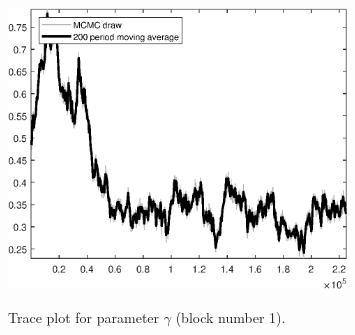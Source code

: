 \begin{figure}[H]
\centering
  \includegraphics[width=0.8\textwidth]{BRS_sectoral/graphs/TracePlot_gam_blck_1}\\
    \caption{Trace plot for parameter $\gamma$ (block number 1).}
\end{figure}
